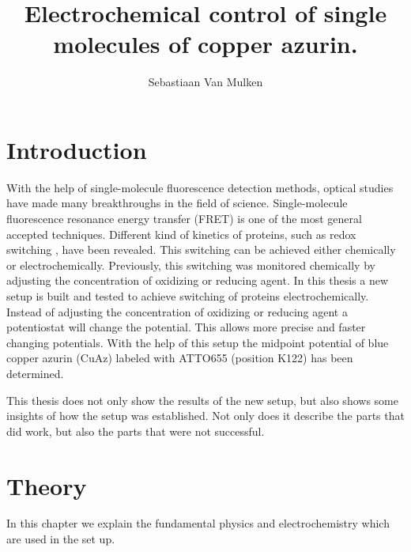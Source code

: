 \documentclass[twoside,single]{lion-msc}
\title{Electrochemical control of single molecules of copper azurin.}
\author{Sebastiaan Van Mulken}
\begin{document}
\maketitle



\chapter{Introduction}
With the help of single-molecule fluorescence detection methods, optical studies have made many breakthroughs in the field of science. Single-molecule fluorescence resonance energy transfer (FRET) is one of the most general accepted techniques. Different kind of kinetics of proteins, such as redox switching \cite{Akklc}, have been revealed. This switching can be achieved either chemically or electrochemically. Previously, this switching was monitored chemically by adjusting the concentration of oxidizing or reducing agent. In this thesis a new setup is built and tested to achieve switching of proteins electrochemically. Instead of adjusting the concentration of oxidizing or reducing agent a potentiostat will change the potential. This allows more precise and faster changing potentials. With the help of this setup the midpoint potential of blue copper azurin (CuAz) labeled with ATTO655 (position K122) has been determined. 

This thesis does not only show the results of the new setup, but also shows some insights of how the setup was established. Not only does it describe the parts that did work, but also the parts that were not successful. 


\chapter{Theory}
In this chapter we explain the fundamental physics and electrochemistry which are used in the set up.
\end{document}
